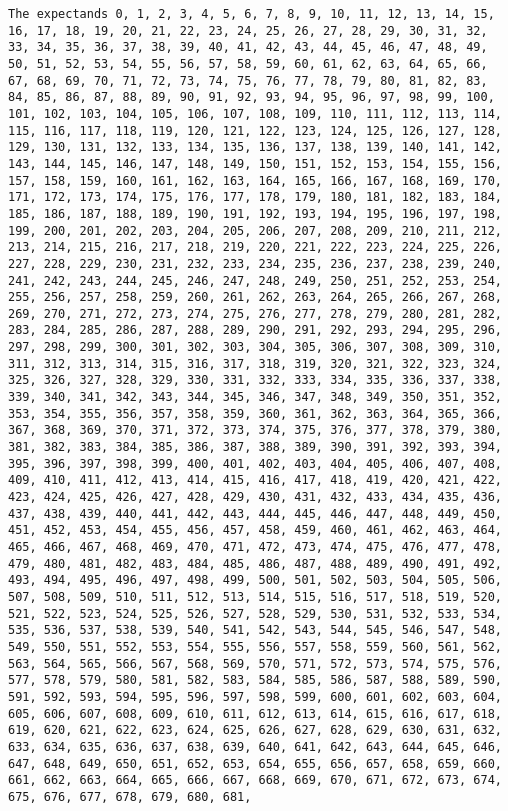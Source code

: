 \documentclass[
  letterpaper,
  DIV=11,
  numbers=noendperiod]{scrartcl}
\begin{document}
\begin{verbatim}
The expectands 0, 1, 2, 3, 4, 5, 6, 7, 8, 9, 10, 11, 12, 13, 14, 15, 16, 17, 18, 19, 20, 21, 22, 23, 24, 25, 26, 27, 28, 29, 30, 31, 32, 33, 34, 35, 36, 37, 38, 39, 40, 41, 42, 43, 44, 45, 46, 47, 48, 49, 50, 51, 52, 53, 54, 55, 56, 57, 58, 59, 60, 61, 62, 63, 64, 65, 66, 67, 68, 69, 70, 71, 72, 73, 74, 75, 76, 77, 78, 79, 80, 81, 82, 83, 84, 85, 86, 87, 88, 89, 90, 91, 92, 93, 94, 95, 96, 97, 98, 99, 100, 101, 102, 103, 104, 105, 106, 107, 108, 109, 110, 111, 112, 113, 114, 115, 116, 117, 118, 119, 120, 121, 122, 123, 124, 125, 126, 127, 128, 129, 130, 131, 132, 133, 134, 135, 136, 137, 138, 139, 140, 141, 142, 143, 144, 145, 146, 147, 148, 149, 150, 151, 152, 153, 154, 155, 156, 157, 158, 159, 160, 161, 162, 163, 164, 165, 166, 167, 168, 169, 170, 171, 172, 173, 174, 175, 176, 177, 178, 179, 180, 181, 182, 183, 184, 185, 186, 187, 188, 189, 190, 191, 192, 193, 194, 195, 196, 197, 198, 199, 200, 201, 202, 203, 204, 205, 206, 207, 208, 209, 210, 211, 212, 213, 214, 215, 216, 217, 218, 219, 220, 221, 222, 223, 224, 225, 226, 227, 228, 229, 230, 231, 232, 233, 234, 235, 236, 237, 238, 239, 240, 241, 242, 243, 244, 245, 246, 247, 248, 249, 250, 251, 252, 253, 254, 255, 256, 257, 258, 259, 260, 261, 262, 263, 264, 265, 266, 267, 268, 269, 270, 271, 272, 273, 274, 275, 276, 277, 278, 279, 280, 281, 282, 283, 284, 285, 286, 287, 288, 289, 290, 291, 292, 293, 294, 295, 296, 297, 298, 299, 300, 301, 302, 303, 304, 305, 306, 307, 308, 309, 310, 311, 312, 313, 314, 315, 316, 317, 318, 319, 320, 321, 322, 323, 324, 325, 326, 327, 328, 329, 330, 331, 332, 333, 334, 335, 336, 337, 338, 339, 340, 341, 342, 343, 344, 345, 346, 347, 348, 349, 350, 351, 352, 353, 354, 355, 356, 357, 358, 359, 360, 361, 362, 363, 364, 365, 366, 367, 368, 369, 370, 371, 372, 373, 374, 375, 376, 377, 378, 379, 380, 381, 382, 383, 384, 385, 386, 387, 388, 389, 390, 391, 392, 393, 394, 395, 396, 397, 398, 399, 400, 401, 402, 403, 404, 405, 406, 407, 408, 409, 410, 411, 412, 413, 414, 415, 416, 417, 418, 419, 420, 421, 422, 423, 424, 425, 426, 427, 428, 429, 430, 431, 432, 433, 434, 435, 436, 437, 438, 439, 440, 441, 442, 443, 444, 445, 446, 447, 448, 449, 450, 451, 452, 453, 454, 455, 456, 457, 458, 459, 460, 461, 462, 463, 464, 465, 466, 467, 468, 469, 470, 471, 472, 473, 474, 475, 476, 477, 478, 479, 480, 481, 482, 483, 484, 485, 486, 487, 488, 489, 490, 491, 492, 493, 494, 495, 496, 497, 498, 499, 500, 501, 502, 503, 504, 505, 506, 507, 508, 509, 510, 511, 512, 513, 514, 515, 516, 517, 518, 519, 520, 521, 522, 523, 524, 525, 526, 527, 528, 529, 530, 531, 532, 533, 534, 535, 536, 537, 538, 539, 540, 541, 542, 543, 544, 545, 546, 547, 548, 549, 550, 551, 552, 553, 554, 555, 556, 557, 558, 559, 560, 561, 562, 563, 564, 565, 566, 567, 568, 569, 570, 571, 572, 573, 574, 575, 576, 577, 578, 579, 580, 581, 582, 583, 584, 585, 586, 587, 588, 589, 590, 591, 592, 593, 594, 595, 596, 597, 598, 599, 600, 601, 602, 603, 604, 605, 606, 607, 608, 609, 610, 611, 612, 613, 614, 615, 616, 617, 618, 619, 620, 621, 622, 623, 624, 625, 626, 627, 628, 629, 630, 631, 632, 633, 634, 635, 636, 637, 638, 639, 640, 641, 642, 643, 644, 645, 646, 647, 648, 649, 650, 651, 652, 653, 654, 655, 656, 657, 658, 659, 660, 661, 662, 663, 664, 665, 666, 667, 668, 669, 670, 671, 672, 673, 674, 675, 676, 677, 678, 679, 680, 681, 
\end{verbatim}
\end{document}

